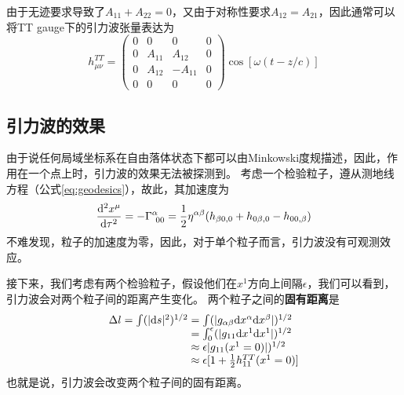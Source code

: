 由于无迹要求导致了$A_{11}+A_{22} = 0$，又由于对称性要求$A_{12}=A_{21}$，因此通常可以将TT gauge下的引力波张量表达为
\begin{equation}\label{eq:TT_hmunu}
  h_{\mu\nu}^{TT} ={\begin{pmatrix}
    0 & 0 & 0 & 0\\
    0 & A_{11} & A_{12} & 0\\ 
    0 & A_{12} & -A_{11} & 0\\
  0 & 0 & 0 & 0\end{pmatrix}}  \cos\left[ \omega (t-z/c)\right]
\end{equation}

\subsection{引力波的效果}
由于\GR 说任何局域坐标系在自由落体状态下都可以由Minkowski度规描述，因此，作用在一个点上时，引力波的效果无法被探测到。
考虑一个检验粒子，遵从测地线方程（公式\ref{eq:geodesics}），故此，其加速度为
\begin{equation}\label{eq:GWparticle} 
  \frac{{\rm d}^2 x^\mu}{{\rm d}\tau^2} = -\Gamma ^{\alpha} _{~00} = \frac{1}{2}\eta^{\alpha\beta}(h_{\beta 0,0}+h_{0\beta ,0}-h_{00,\beta })
\end{equation}
不难发现，粒子的加速度为零，因此，对于单个粒子而言，引力波没有可观测效应。

接下来，我们考虑有两个检验粒子，假设他们在$x^1$方向上间隔$\epsilon$，我们可以看到，引力波会对两个粒子间的距离产生变化。
两个粒子之间的{\textbf{固有距离}}是
\begin{equation}\label{eq:PropDis2part} 
\begin{array}{r@{}l}
  \Delta l = \int (|{\rm d}s|^2) ^{1/2} &{}= \int (| g_{\alpha\beta}{\rm d}x^\alpha {\rm d}x^\beta|) ^{1/2} \\
  &{}=\int_0^\epsilon  (| g_{11}{\rm d}x^1 {\rm d}x^1|) ^{1/2} \\
  &{}\approx \epsilon  | g_{11}(x^1=0)|) ^{1/2} \\ &{}\approx \epsilon  [1+ \frac{1}{2} h_{11}^{TT}(x^1=0)]
\end{array}
\end{equation}
也就是说，引力波会改变两个粒子间的固有距离。

